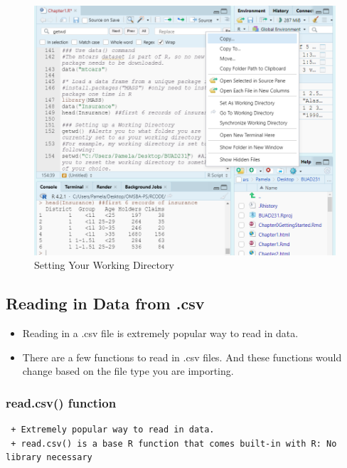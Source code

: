 \documentclass[
  letterpaper,
  DIV=11,
  numbers=noendperiod]{scrreprt}
\providecommand{\tightlist}{%
  \setlength{\itemsep}{0pt}\setlength{\parskip}{0pt}}\usepackage{longtable,booktabs,array}
\begin{document}
\begin{figure}[H]

{\centering \includegraphics{Pictures/Ch1/WorkingDir.png}

}

\caption{Setting Your Working Directory}

\end{figure}%

\subsection{Reading in Data from .csv}\label{reading-in-data-from-.csv}

\begin{itemize}
\tightlist
\item
  Reading in a .csv file is extremely popular way to read in data.
\item
  There are a few functions to read in .csv files. And these functions
  would change based on the file type you are importing.
\end{itemize}

\subsubsection{read.csv() function}\label{read.csv-function}

\begin{verbatim}
 + Extremely popular way to read in data.
 + read.csv() is a base R function that comes built-in with R: No library necessary
\end{verbatim}
\end{document}
